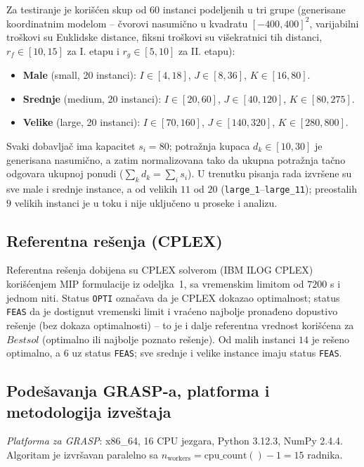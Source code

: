 \documentclass[12pt,a4paper]{article}
\begin{document}
Za testiranje je korišćen skup od $60$ instanci podeljenih u tri grupe
(generisane koordinatnim modelom -- čvorovi nasumično u kvadratu
$[-400,400]^2$, varijabilni troškovi su Euklidske distance, fiksni troškovi
su višekratnici tih distanci, $r_f \in [10,15]$ za I. etapu i $r_g \in [5,10]$
za II. etapu):
\begin{itemize}
  \item \textbf{Male} (small, 20 instanci): $I \in [4, 18]$, $J \in [8, 36]$, $K \in [16, 80]$.
  \item \textbf{Srednje} (medium, 20 instanci): $I \in [20, 60]$, $J \in [40, 120]$, $K \in [80, 275]$.
  \item \textbf{Velike} (large, 20 instanci): $I \in [70, 160]$, $J \in [140, 320]$, $K \in [280, 800]$.
\end{itemize}
Svaki dobavljač ima kapacitet $s_i = 80$; potražnja kupaca $d_k \in [10,30]$
je generisana nasumično, a zatim normalizovana tako da ukupna potražnja tačno
odgovara ukupnoj ponudi ($\sum_k d_k = \sum_i s_i$). U trenutku pisanja rada
izvršene su sve male i srednje instance, a od velikih $11$ od $20$
(\texttt{large\_1}--\texttt{large\_11}); preostalih $9$ velikih instanci je u
toku i nije uključeno u proseke i analizu.

\subsection{Referentna rešenja (CPLEX)}

Referentna rešenja dobijena su CPLEX solverom (IBM ILOG CPLEX) korišćenjem MIP
formulacije iz odeljka~1, sa vremenskim limitom od $7200$ s i jednom niti.
Status \texttt{OPTI} označava da je CPLEX dokazao optimalnost; status
\texttt{FEAS} da je dostignut vremenski limit i vraćeno najbolje pronađeno
dopustivo rešenje (bez dokaza optimalnosti) -- to je i dalje referentna
vrednost korišćena za $Bestsol$ (optimalno ili najbolje poznato rešenje). Od
malih instanci $14$ je rešeno optimalno, a $6$ uz status \texttt{FEAS}; sve
srednje i velike instance imaju status \texttt{FEAS}.

\subsection{Podešavanja GRASP-a, platforma i metodologija izveštaja}

\textit{Platforma za GRASP}: x86\_64, 16 CPU jezgara, Python 3.12.3, NumPy
2.4.4. Algoritam je izvršavan paralelno sa
$n_{\text{workers}} = \text{cpu\_count}()-1 = 15$ radnika.
\end{document}
